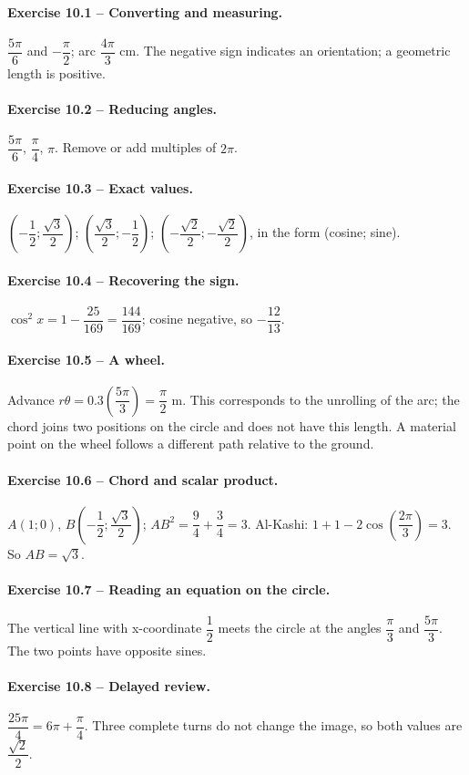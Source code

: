 \paragraph{Exercise 10.1 -- Converting and measuring.} $\dfrac{5\pi}{6}$ and $-\dfrac{\pi}{2}$; arc $\dfrac{4\pi}{3}$ cm. The negative sign indicates an orientation; a geometric length is positive.
\paragraph{Exercise 10.2 -- Reducing angles.} $\dfrac{5\pi}{6}$, $\dfrac{\pi}{4}$, $\pi$. Remove or add multiples of $2\pi$.
\paragraph{Exercise 10.3 -- Exact values.} $(-\dfrac{1}{2};\dfrac{\sqrt 3}{2})$; $(\dfrac{\sqrt 3}{2};-\dfrac{1}{2})$; $(-\dfrac{\sqrt 2}{2};-\dfrac{\sqrt 2}{2})$, in the form (cosine; sine).
\paragraph{Exercise 10.4 -- Recovering the sign.} $\cos ^2x=1-\dfrac{25}{169}=\dfrac{144}{169}$; cosine negative, so $-\dfrac{12}{13}$.
\paragraph{Exercise 10.5 -- A wheel.} Advance $r\theta =0.3(\dfrac{5\pi}{3})=\dfrac{\pi}{2}$ m. This corresponds to the unrolling of the arc; the chord joins two positions on the circle and does not have this length. A material point on the wheel follows a different path relative to the ground.
\paragraph{Exercise 10.6 -- Chord and scalar product.} $A(1;0)$, $B(-\dfrac{1}{2};\dfrac{\sqrt 3}{2})$; $AB^2=\dfrac{9}{4}+\dfrac{3}{4}=3$. Al-Kashi: $1+1-2\cos (\dfrac{2\pi}{3})=3$. So $AB=\sqrt3$.
\paragraph{Exercise 10.7 -- Reading an equation on the circle.} The vertical line with x-coordinate $\dfrac{1}{2}$ meets the circle at the angles $\dfrac{\pi}{3}$ and $\dfrac{5\pi}{3}$. The two points have opposite sines.
\paragraph{Exercise 10.8 -- Delayed review.} $\dfrac{25\pi}{4}=6\pi +\dfrac{\pi}{4}$. Three complete turns do not change the image, so both values are $\dfrac{\sqrt 2}{2}$.
